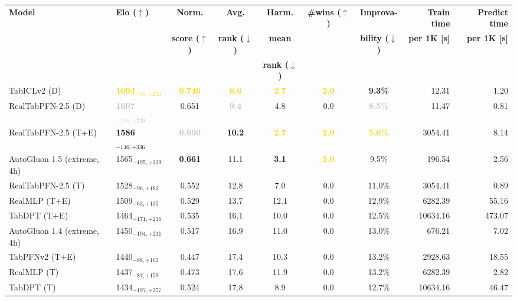 \begin{tabular}{llcccccrr}
\toprule
\textbf{Model} & \textbf{Elo ($\uparrow$)} & \textbf{Norm.} & \textbf{Avg.} & \textbf{Harm.} & \textbf{\#wins ($\uparrow$)} & \textbf{Improva-} & \textbf{Train time} & \textbf{Predict time} \\
 &  & \textbf{score ($\uparrow$)} & \textbf{rank ($\downarrow$)} & \textbf{mean} &  & \textbf{bility ($\downarrow$)} & \textbf{per 1K [s]} & \textbf{per 1K [s]} \\
 &  &  &  & \textbf{rank ($\downarrow$)} &  &  &  &  \\
\midrule
TabICLv2 (D) & \textcolor{gold}{\textbf{1694${}_{-96,+254}$}} & \textcolor{gold}{\textbf{0.746}} & \textcolor{gold}{\textbf{6.6}} & \textcolor{gold}{\textbf{2.7}} & \textcolor{gold}{\textbf{2.0}} & \textcolor{bronze}{\textbf{9.3\%}} & 12.31 & 1.20 \\
RealTabPFN-2.5 (D) & \textcolor{silver}{\textbf{1607${}_{-118,+220}$}} & 0.651 & \textcolor{silver}{\textbf{9.4}} & 4.8 & 0.0 & \textcolor{silver}{\textbf{8.5\%}} & 11.47 & 0.81 \\
RealTabPFN-2.5 (T+E) & \textcolor{bronze}{\textbf{1586${}_{-146,+336}$}} & \textcolor{silver}{\textbf{0.690}} & \textcolor{bronze}{\textbf{10.2}} & \textcolor{gold}{\textbf{2.7}} & \textcolor{gold}{\textbf{2.0}} & \textcolor{gold}{\textbf{5.0\%}} & 3054.41 & 8.14 \\
AutoGluon 1.5 (extreme, 4h) & 1565${}_{-195,+339}$ & \textcolor{bronze}{\textbf{0.661}} & 11.1 & \textcolor{bronze}{\textbf{3.1}} & \textcolor{gold}{\textbf{2.0}} & 9.5\% & 196.54 & 2.56 \\
RealTabPFN-2.5 (T) & 1528${}_{-96,+182}$ & 0.552 & 12.8 & 7.0 & 0.0 & 11.0\% & 3054.41 & 0.89 \\
RealMLP (T+E) & 1509${}_{-63,+135}$ & 0.529 & 13.7 & 12.1 & 0.0 & 12.9\% & 6282.39 & 55.16 \\
TabDPT (T+E) & 1464${}_{-171,+236}$ & 0.535 & 16.1 & 10.0 & 0.0 & 12.5\% & 10634.16 & 473.07 \\
AutoGluon 1.4 (extreme, 4h) & 1450${}_{-104,+211}$ & 0.517 & 16.9 & 11.0 & 0.0 & 13.0\% & 676.21 & 7.02 \\
TabPFNv2 (T+E) & 1440${}_{-88,+162}$ & 0.447 & 17.4 & 10.3 & 0.0 & 13.2\% & 2928.63 & 18.55 \\
RealMLP (T) & 1437${}_{-87,+159}$ & 0.473 & 17.6 & 11.9 & 0.0 & 13.2\% & 6282.39 & 2.82 \\
TabDPT (T) & 1434${}_{-197,+257}$ & 0.524 & 17.8 & 8.9 & 0.0 & 12.7\% & 10634.16 & 46.47 \\

\end{tabular}
